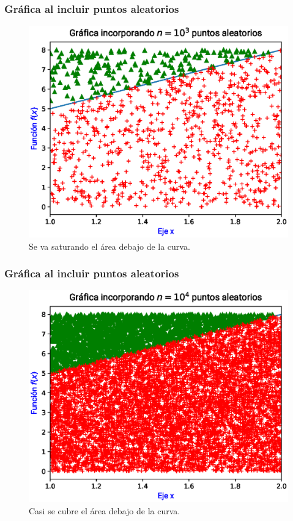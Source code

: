 \documentclass[12pt]{beamer}
\begin{document}
\begin{frame}
\frametitle{Gráfica al incluir puntos aleatorios}
\begin{figure}
    \centering
    \includegraphics[scale=0.55]{Imagenes/area_puntos_03.eps}
    \caption{Se va saturando el área debajo de la curva.}
\end{figure}
\end{frame}
\begin{frame}
\frametitle{Gráfica al incluir puntos aleatorios}
\begin{figure}
    \centering
    \includegraphics[scale=0.55]{Imagenes/area_puntos_04.eps}
    \caption{Casi se cubre el área debajo de la curva.}
\end{figure}
\end{frame}
\end{document}
